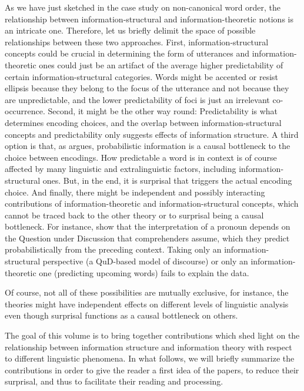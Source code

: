 \documentclass[output=paper,colorlinks,citecolor=brown]{langscibook}
\begin{document}
As we have just sketched in the case study on non-canonical word order, the relationship between information-structural and information-theoretic notions is an intricate one. Therefore, let us briefly delimit the space of possible relationships between these two approaches. 
First, information-structural concepts could be crucial in determining the form of utterances and information-theoretic ones could just be an artifact of the average higher predictability of certain information-structural categories. Words might be accented or resist ellipsis because they belong to the focus of the utterance and not because they are unpredictable, and the lower predictability of foci is just an irrelevant co-occurrence. 
Second, it might be the other way round: Predictability is what determines encoding choices, and the overlap between information-structural concepts and predictability only suggests effects of information structure. 
A third option is that, as \citet{levy2008} argues, probabilistic information is a causal bottleneck to the choice between encodings. How predictable a word is in context is of course affected by many linguistic and extralinguistic factors, including information-structural ones. But, in the end, it is surprisal that triggers the actual encoding choice.
And finally, there might be independent and possibly interacting contributions of information-theoretic and information-structural concepts, which cannot be traced back to the other theory or to surprisal being a causal bottleneck. For instance, \citet{kehler_rohde_2017} show that the interpretation of a pronoun depends on the Question under Discussion that comprehenders assume, which they predict probabilistically from the preceding context. Taking only an information-structural perspective (a QuD-based model of discourse) or only an information-theoretic one (predicting upcoming words) fails to explain the data. %

Of course, not all of these possibilities are mutually exclusive, for instance, the theories might have independent effects on different levels of linguistic analysis even though surprisal functions as a causal bottleneck on others.

 The goal of this volume is to bring together contributions which shed light on the relationship between information structure and information theory with respect to different linguistic phenomena. In what follows, we will briefly summarize the contributions in order to give the reader a first idea of the papers, to reduce their surprisal, and thus to facilitate their reading and processing.
\end{document}
